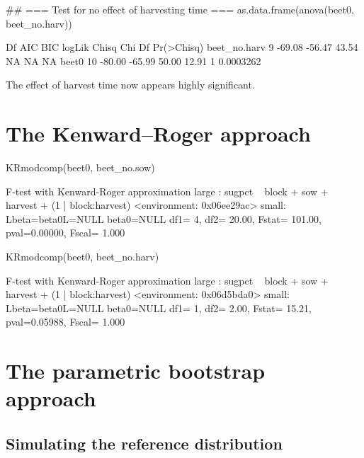 \documentclass[12pt]{article}
\begin{document}
\begin{Schunk}
\begin{Sinput}
 ## === Test for no effect of harvesting time ===
 as.data.frame(anova(beet0, beet_no.harv))
\end{Sinput}
\begin{Soutput}
             Df    AIC    BIC logLik Chisq Chi Df Pr(>Chisq)
beet_no.harv  9 -69.08 -56.47  43.54    NA     NA         NA
beet0        10 -80.00 -65.99  50.00 12.91      1  0.0003262
\end{Soutput}
\end{Schunk}

The effect of harvest time now appears highly significant.


\section{The Kenward--Roger approach}
\label{sec:kenw-roger-appr}

\begin{Schunk}
\begin{Sinput}
 KRmodcomp(beet0, beet_no.sow)
\end{Sinput}
\begin{Soutput}
F-test with Kenward-Roger approximation 
large : sugpct ~ block + sow + harvest + (1 | block:harvest)
<environment: 0x06ee29ac>
small: Lbeta=beta0L=NULL
beta0=NULL
df1=  4, df2=   20.00, Fstat=  101.00, pval=0.00000, Fscal= 1.000 
\end{Soutput}
\begin{Sinput}
 KRmodcomp(beet0, beet_no.harv)
\end{Sinput}
\begin{Soutput}
F-test with Kenward-Roger approximation 
large : sugpct ~ block + sow + harvest + (1 | block:harvest)
<environment: 0x06d5bda0>
small: Lbeta=beta0L=NULL
beta0=NULL
df1=  1, df2=    2.00, Fstat=   15.21, pval=0.05988, Fscal= 1.000 
\end{Soutput}
\end{Schunk}

\section{The parametric bootstrap approach}
\label{sec:param-bootstr-appr}

\subsection{Simulating the reference distribution}
\label{sec:simul-refer-distr}
\end{document}
